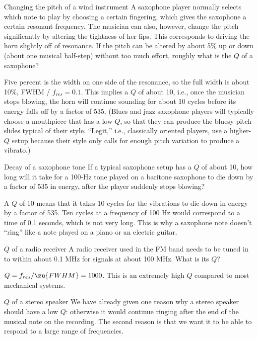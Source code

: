 \begin{eg}{Changing the pitch of a wind instrument}
\egquestion A saxophone player normally selects which note to
play by choosing a certain fingering, which gives the
saxophone a certain resonant frequency. The musician can
also, however, change the pitch significantly by altering
the tightness of her lips. This corresponds to driving the
horn slightly off of resonance. If the pitch can be altered
by about 5\% up or down (about one musical half-step)
without too much effort, roughly what is the $Q$ of a saxophone?

\eganswer Five percent is the width on one side of the
resonance, so the full width is about 10\%, FWHM /
$f_{res}=0.1$. This implies a $Q$ of about 10, i.e., once the
musician stops blowing, the horn will continue sounding for
about 10 cycles before its energy falls off by a factor of
535. (Blues and jazz saxophone players will typically choose
a mouthpiece that has a low $Q$, so that they can produce
the bluesy pitch-slides typical of their style. ``Legit,''
i.e., classically oriented players, use a higher-$Q$ setup
because their style only calls for enough pitch variation
to produce a vibrato.)
\end{eg}

\begin{eg}{Decay of a saxophone tone}
\egquestion If a typical saxophone setup has a $Q$ of about
10, how long will it take for a 100-Hz tone played on a
baritone saxophone to die down by a factor of 535 in energy,
after the player suddenly stops blowing?

\eganswer A $Q$ of 10 means that it takes 10 cycles for the
vibrations to die down in energy by a factor of 535. Ten
cycles at a frequency of 100 Hz would correspond to a time
of 0.1 seconds, which is not very long. This is why a
saxophone note doesn't ``ring'' like a note played on a
piano or an electric guitar.
\end{eg}

\begin{eg}{$Q$ of a radio receiver}
\egquestion A radio receiver used in the FM band needs to be
tuned in to within about 0.1 MHz for signals at about 100
MHz. What is its $Q$?

\eganswer $Q=f_{res}/\zu{FWHM}=1000$. This is an extremely
high $Q$ compared to most mechanical systems.
\end{eg}

\begin{eg}{$Q$ of a stereo speaker}
We have already given one reason why a stereo speaker should
have a low $Q$: otherwise it would continue ringing after
the end of the musical note on the recording. The second
reason is that we want it to be able to respond to a large
range of frequencies.
\end{eg}

